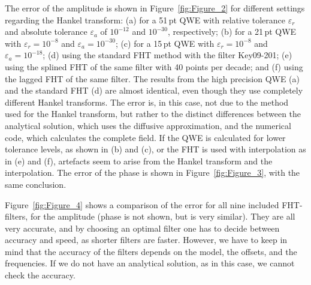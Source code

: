 \documentclass[manuscript,revised]{geophysics}
\begin{document}
The error of the amplitude is shown in Figure~\ref{fig:Figure_2} for
different settings regarding the Hankel transform: (a) for a 51\,pt QWE with
relative tolerance $\varepsilon_r$ and absolute tolerance $\varepsilon_a$ of
$10^{-12}$ and $10^{-30}$, respectively; (b) for a 21\,pt QWE with
$\varepsilon_r = 10^{-8}$ and $\varepsilon_a = 10^{-30}$; (c) for a 15\,pt QWE
with $\varepsilon_r = 10^{-8}$ and $\varepsilon_a = 10^{-18}$; (d) using the
standard FHT method with the filter Key09-201; (e) using the splined FHT of the
same filter with 40 points per decade; and (f) using the lagged FHT of the same
filter.
%
%
The results from the high precision QWE (a) and the standard FHT (d) are almost
identical, even though they use completely different Hankel transforms. The
error is, in this case, not due to the method used for the Hankel transform,
but rather to the distinct differences between the analytical solution, which
uses the diffusive approximation, and the numerical code, which calculates the
complete field. If the QWE is calculated for lower tolerance levels, as shown
in (b) and (c), or the FHT is used with interpolation as in (e) and (f),
artefacts seem to arise from the Hankel transform and the interpolation. The
error of the phase is shown in Figure~\ref{fig:Figure_3}, with the same
conclusion.
%
%

Figure~\ref{fig:Figure_4} shows a comparison of the error for all
nine included FHT-filters, for the amplitude (phase is not shown, but is very
similar). They are all very accurate, and by choosing an optimal filter one has
to decide between accuracy and speed, as shorter filters are faster. However,
we have to keep in mind that the accuracy of the filters depends on the model,
the offsets, and the frequencies. If we do not have an analytical solution, as
in this case, we cannot check the accuracy.
%
%
\end{document}
